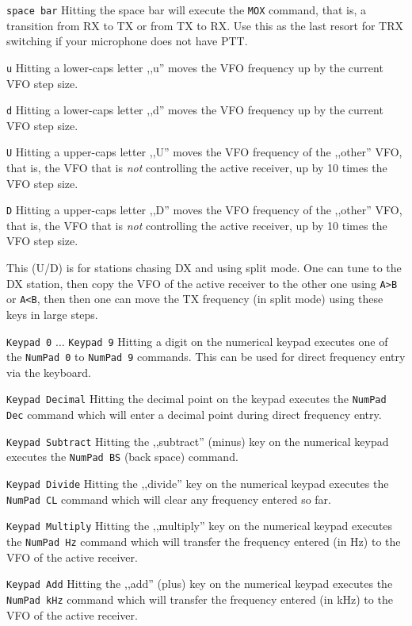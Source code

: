 \documentclass[12pt]{book}
\def\rett#1{\texttt{\color{red}#1}}
\def\bltt#1{\texttt{\color{blue}#1}}
\begin{document}
\rett{space bar} Hitting the space bar will execute the \bltt{MOX} command, that is, a
transition from RX to TX or from TX to RX. Use this as the last resort for TRX switching
if your microphone does not have PTT.

\rett{u} Hitting a lower-caps letter ,,u'' moves the VFO frequency up by the current VFO
step size.

\rett{d} Hitting a lower-caps letter ,,d'' moves the VFO frequency up by the current VFO
step size.

\rett{U} Hitting a upper-caps letter ,,U'' moves the VFO frequency of the ,,other'' VFO, that is,
the VFO that is \textit{not} controlling the active receiver, up by 10 times the VFO step size.

\rett{D} Hitting a upper-caps letter ,,D'' moves the VFO frequency of the ,,other'' VFO, that is,
the VFO that is \textit{not} controlling the active receiver, up by 10 times the VFO step size.

This (U/D) is for stations chasing DX and using split mode. One can tune to the DX station,
then copy the VFO of the active receiver to the other one using \bltt{A>B} or \bltt{A<B}, then then
one can  move the TX frequency (in split mode) using these keys in large steps.

\rett{Keypad 0} $\ldots$ \rett{Keypad 9} Hitting a digit on the numerical keypad executes one of the
\bltt{NumPad 0} to \bltt{NumPad 9} commands. This can be used for direct frequency entry
via the keyboard.

\rett{Keypad Decimal} Hitting the decimal point on the keypad executes the \bltt{NumPad Dec}
command which will enter a decimal point during direct frequency entry.

\rett{Keypad Subtract} Hitting the ,,subtract'' (minus) key on the numerical keypad executes the
\bltt{NumPad BS} (back space) command.

\rett{Keypad Divide} Hitting the ,,divide'' key on the numerical keypad executes the \bltt{NumPad CL}
command which will clear any frequency entered so far.

\rett{Keypad Multiply} Hitting the ,,multiply'' key on the numerical keypad executes the \bltt{NumPad Hz}
command which will transfer the frequency entered (in Hz) to the VFO of the active receiver.

\rett{Keypad Add} Hitting the ,,add'' (plus) key on the numerical keypad executes the \bltt{NumPad kHz}
command which will transfer the frequency entered (in kHz) to the VFO of the active receiver.
\end{document}

